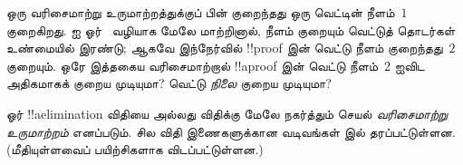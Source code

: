\documentclass[../../../include/open-logic-section]{subfiles}
\begin{document}
\begin{prob}
ஒரு வரிசைமாற்று உருமாற்றத்துக்குப் பின் குறைந்தது
ஒரு வெட்டின் நீளம்~$1$ குறைகிறது. \Elim{\land}
ஐ ஓர்~\Elim{\lor} வழியாக மேலே மாற்றினால்,
நீளம் குறையும் வெட்டுத் தொடர்கள் உண்மையில் இரண்டு;
ஆகவே இந்நேர்வில் !!{proof} இன் வெட்டு நீளம்
குறைந்தது~$2$ குறையும். ஒரே இத்தகைய வரிசைமாற்றால்
!!a{proof} இன் வெட்டு நீளம்~$2$ ஐவிட அதிகமாகக்
குறைய முடியுமா? வெட்டு \emph{நிலை} குறைய முடியுமா?
\end{prob}

ஓர் !!a{elimination} விதியை \Elim{\lor} அல்லது
\Elim{\lexists} விதிக்கு மேலே நகர்த்தும் செயல்
\emph{வரிசைமாற்று உருமாற்றம்} எனப்படும். சில விதி
இணைகளுக்கான வடிவங்கள்
 இல்
தரப்பட்டுள்ளன. (மீதியுள்ளவைப் பயிற்சிகளாக
விடப்பட்டுள்ளன.)

\end{document}
